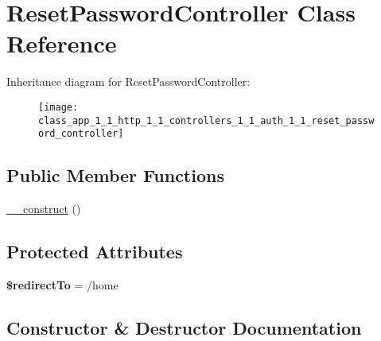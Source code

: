 \hypertarget{class_app_1_1_http_1_1_controllers_1_1_auth_1_1_reset_password_controller}{}\section{Reset\+Password\+Controller Class Reference}
\label{class_app_1_1_http_1_1_controllers_1_1_auth_1_1_reset_password_controller}
Inheritance diagram for Reset\+Password\+Controller\+:\begin{figure}[H]
\begin{center}
\leavevmode
\texttt{[image: class\_app\_1\_1\_http\_1\_1\_controllers\_1\_1\_auth\_1\_1\_reset\_password\_controller]}
\end{center}
\end{figure}
\subsection*{Public Member Functions}
\begin{DoxyCompactItemize}
\item 
\mbox{\hyperlink{class_app_1_1_http_1_1_controllers_1_1_auth_1_1_reset_password_controller_a095c5d389db211932136b53f25f39685}{\+\_\+\+\_\+construct}} ()
\end{DoxyCompactItemize}
\subsection*{Protected Attributes}
\begin{DoxyCompactItemize}
\item 
\mbox{\label{class_app_1_1_http_1_1_controllers_1_1_auth_1_1_reset_password_controller_a1d19101ee5de7186666ce86a530cd501}} 
{\bfseries \$redirect\+To} = \textquotesingle{}/home\textquotesingle{}
\end{DoxyCompactItemize}


\subsection{Constructor \& Destructor Documentation}
\mbox{\label{class_app_1_1_http_1_1_controllers_1_1_auth_1_1_reset_password_controller_a095c5d389db211932136b53f25f39685}} 
